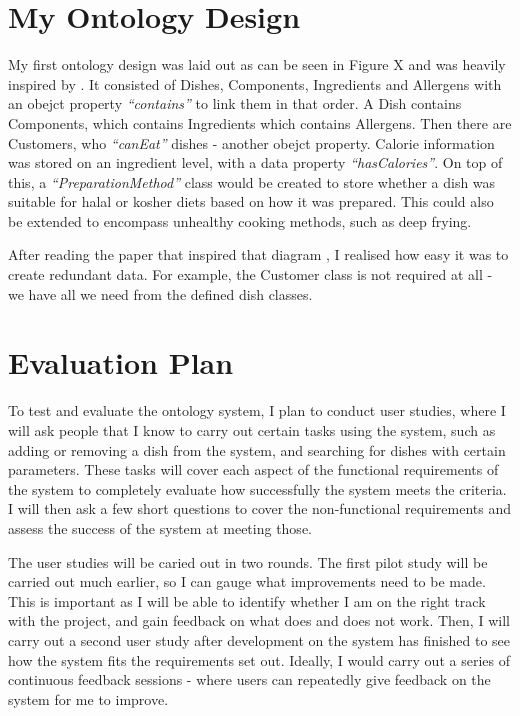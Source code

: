 \section{My Ontology Design}

My first ontology design was laid out as can be seen in Figure X and was heavily inspired by \cite{ontology_pitfalls}. It consisted of Dishes, Components, Ingredients and Allergens with an obejct property \textit{``contains''} to link them in that order. A Dish contains Components, which contains Ingredients which contains Allergens. Then there are Customers, who \textit{``canEat''} dishes - another obejct property. Calorie information was stored on an ingredient level, with a data property \textit{``hasCalories''}. On top of this, a \textit{``PreparationMethod''} class would be created to store whether a dish was suitable for halal or kosher diets based on how it was prepared. This could also be extended to encompass unhealthy cooking methods, such as deep frying.

After reading the paper that inspired that diagram \cite{ontology_pitfalls}, I realised how easy it was to create redundant data. For example, the Customer class is not required at all - we have all we need from the defined dish classes.

\section{Evaluation Plan}

To test and evaluate the ontology system, I plan to conduct user studies, where I will ask people that I know to carry out certain tasks using the system, such as adding or removing a dish from the system, and searching for dishes with certain parameters. These tasks will cover each aspect of the functional requirements of the system to completely evaluate how successfully the system meets the criteria. I will then ask a few short questions to cover the non-functional requirements and assess the success of the system at meeting those.

The user studies will be caried out in two rounds. The first pilot study will be carried out much earlier, so I can gauge what improvements need to be made. This is important as I will be able to identify whether I am on the right track with the project, and gain feedback on what does and does not work. Then, I will carry out a second user study after development on the system has finished to see how the system fits the requirements set out. Ideally, I would carry out a series of continuous feedback sessions - where users can repeatedly give feedback on the system for me to improve.

